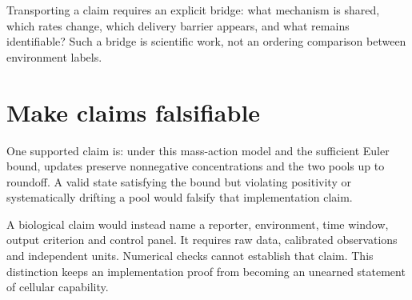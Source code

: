 Transporting a claim requires an explicit bridge: what mechanism is shared,
which rates change, which delivery barrier appears, and what remains
identifiable? Such a bridge is scientific work, not an ordering comparison
between environment labels.

\section{Make claims falsifiable}
One supported claim is: under this mass-action model and the sufficient Euler
bound, updates preserve nonnegative concentrations and the two pools up to
roundoff. A valid state satisfying the bound but violating positivity or
systematically drifting a pool would falsify that implementation claim.

A biological claim would instead name a reporter, environment, time window,
output criterion and control panel. It requires raw data, calibrated observations
and independent units. Numerical checks cannot establish that claim.
This distinction keeps an implementation proof from becoming an unearned
statement of cellular capability.

